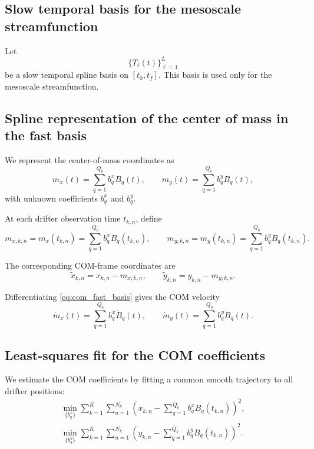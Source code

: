 \subsection{Slow temporal basis for the mesoscale streamfunction}

Let
\begin{equation}
\{T_\ell(t)\}_{\ell=1}^{L}
\label{eq:slow_basis_def}
\end{equation}
be a slow temporal spline basis on $[t_0,t_f]$. This basis is used only for the mesoscale
streamfunction.

\subsection{Spline representation of the center of mass in the fast basis}

We represent the center-of-mass coordinates as
\begin{equation}
m_x(t)=\sum_{q=1}^{Q_b} b^x_q B_q(t),
\qquad
m_y(t)=\sum_{q=1}^{Q_b} b^y_q B_q(t),
\label{eq:com_fast_basis}
\end{equation}
with unknown coefficients $b^x_q$ and $b^y_q$.

At each drifter observation time $t_{k,n}$, define
\begin{equation}
m_{x;k,n}=m_x(t_{k,n})=\sum_{q=1}^{Q_b} b^x_q B_q(t_{k,n}),
\qquad
m_{y;k,n}=m_y(t_{k,n})=\sum_{q=1}^{Q_b} b^y_q B_q(t_{k,n}).
\end{equation}

The corresponding COM-frame coordinates are
\begin{equation}
\tilde{x}_{k,n}=x_{k,n}-m_{x;k,n},
\qquad
\tilde{y}_{k,n}=y_{k,n}-m_{y;k,n}.
\label{eq:relative_coords_fastcom}
\end{equation}

Differentiating \eqref{eq:com_fast_basis} gives the COM velocity
\begin{equation}
\dot{m}_x(t)=\sum_{q=1}^{Q_b} b^x_q \dot{B}_q(t),
\qquad
\dot{m}_y(t)=\sum_{q=1}^{Q_b} b^y_q \dot{B}_q(t).
\label{eq:com_velocity_fastcom}
\end{equation}

\subsection{Least-squares fit for the COM coefficients}

We estimate the COM coefficients by fitting a common smooth trajectory to all drifter
positions:
\begin{align}
\min_{\{b^x_q\}}
\sum_{k=1}^{K}\sum_{n=1}^{N_k}
\left(
x_{k,n}-\sum_{q=1}^{Q_b} b^x_q B_q(t_{k,n})
\right)^2,
\\
\min_{\{b^y_q\}}
\sum_{k=1}^{K}\sum_{n=1}^{N_k}
\left(
y_{k,n}-\sum_{q=1}^{Q_b} b^y_q B_q(t_{k,n})
\right)^2.
\end{align}

